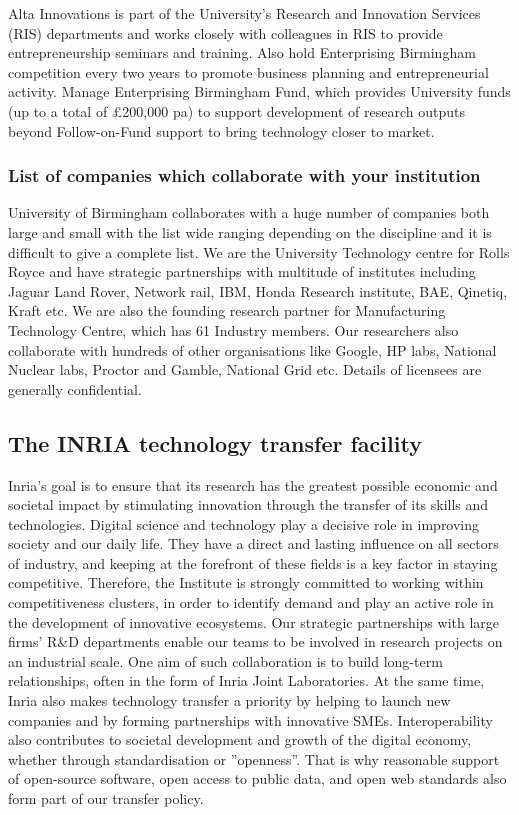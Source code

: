 \documentclass[12pt,a4paper,twoside]{article}
\begin{document}
Alta Innovations is part of the University’s Research and Innovation Services (RIS) departments and works closely with colleagues in RIS to provide entrepreneurship seminars and training.  Also hold Enterprising Birmingham competition every two years to promote business planning and entrepreneurial activity.  Manage Enterprising Birmingham Fund, which provides University funds (up to a total of £200,000 pa) to support development of research outputs beyond Follow-on-Fund support to bring technology closer to market.

\subsubsection{List of companies which collaborate with your institution}
University of Birmingham collaborates with a huge number of companies both large and small with the list wide ranging depending on the discipline and it is difficult to give a complete list. We are the University Technology centre for Rolls Royce and have strategic partnerships with multitude of institutes including Jaguar Land Rover, Network rail, IBM, Honda Research institute, BAE, Qinetiq, Kraft etc. We are also the founding research partner for Manufacturing Technology Centre, which has 61 Industry members. Our researchers also collaborate with hundreds of other organisations like Google, HP labs, National Nuclear labs, Proctor and Gamble, National Grid etc.  Details of licensees are generally confidential.  

\subsection{The INRIA technology  transfer facility}

Inria's goal is to ensure that its research has the greatest possible economic and societal impact by stimulating innovation through the transfer of its skills and technologies.
Digital science and technology play a decisive role in improving society and our daily life. They have a direct and lasting influence on all sectors of industry, and keeping at the forefront of these fields is a key factor in staying competitive.
Therefore, the Institute is strongly committed to working within competitiveness clusters, in order to identify demand and play an active role in the development of innovative ecosystems. Our strategic partnerships with large firms' R\&D departments enable our teams to be involved in research projects on an industrial scale. One aim of such collaboration is to build long-term relationships, often in the form of Inria Joint Laboratories. At the same time, Inria also makes technology transfer a priority by helping to launch new companies and by forming partnerships with innovative SMEs.
Interoperability also contributes to societal development and growth of the digital economy, whether through standardisation or ''openness''. That is why reasonable support of open-source software, open access to public data, and open web standards also form part of our transfer policy.
\end{document}
